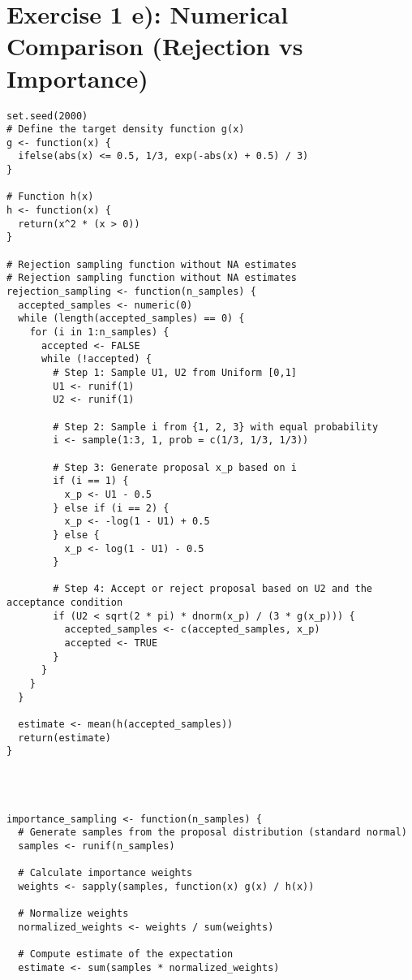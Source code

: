 \section*{Exercise 1 e): Numerical Comparison (Rejection vs Importance)}
\begin{tcolorbox}[colback=white!95!black,colframe=white!50!black, breakable]
\begin{lstlisting}[caption={Exercise 1e}, label={lst:compare}]
set.seed(2000)
# Define the target density function g(x)
g <- function(x) {
  ifelse(abs(x) <= 0.5, 1/3, exp(-abs(x) + 0.5) / 3)
}

# Function h(x)
h <- function(x) {
  return(x^2 * (x > 0))
}

# Rejection sampling function without NA estimates
# Rejection sampling function without NA estimates
rejection_sampling <- function(n_samples) {
  accepted_samples <- numeric(0)
  while (length(accepted_samples) == 0) {
    for (i in 1:n_samples) {
      accepted <- FALSE
      while (!accepted) {
        # Step 1: Sample U1, U2 from Uniform [0,1]
        U1 <- runif(1)
        U2 <- runif(1)
        
        # Step 2: Sample i from {1, 2, 3} with equal probability
        i <- sample(1:3, 1, prob = c(1/3, 1/3, 1/3))
        
        # Step 3: Generate proposal x_p based on i
        if (i == 1) {
          x_p <- U1 - 0.5
        } else if (i == 2) {
          x_p <- -log(1 - U1) + 0.5
        } else {
          x_p <- log(1 - U1) - 0.5
        }
        
        # Step 4: Accept or reject proposal based on U2 and the acceptance condition
        if (U2 < sqrt(2 * pi) * dnorm(x_p) / (3 * g(x_p))) {
          accepted_samples <- c(accepted_samples, x_p)
          accepted <- TRUE
        }
      }
    }
  }
  
  estimate <- mean(h(accepted_samples))
  return(estimate)
}




importance_sampling <- function(n_samples) {
  # Generate samples from the proposal distribution (standard normal)
  samples <- runif(n_samples)
  
  # Calculate importance weights
  weights <- sapply(samples, function(x) g(x) / h(x))
  
  # Normalize weights
  normalized_weights <- weights / sum(weights)
  
  # Compute estimate of the expectation
  estimate <- sum(samples * normalized_weights)
  

\end{lstlisting}
\end{tcolorbox}
